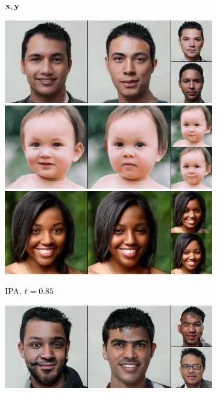 \begin{figure}[t]
\begin{subfigure}[t]{0.22\textwidth}
      \caption{${\mathbf{x}}, {\mathbf{y}}$}
    \end{subfigure}
    \begin{subfigure}[t]{0.25\textwidth}
      \centering
      \includegraphics[height=\ffhqimgheight]{figs/cigcvae/image-samples/ffhq256/freeform_aipo_0_t=0.85_samples.jpg}
      \includegraphics[height=\ffhqimgheight]{figs/cigcvae/image-samples/ffhq256/freeform_aipo_13_t=0.85_samples.jpg}
      \includegraphics[height=\ffhqimgheight]{figs/cigcvae/image-samples/ffhq256/freeform_aipo_32_t=0.85_samples.jpg}
      \caption{IPA, $t=0.85$}
    \end{subfigure}
    \begin{subfigure}[t]{0.25\textwidth}
      \centering
      \includegraphics[height=\ffhqimgheight]{figs/cigcvae/image-samples/ffhq256/freeform_aipo_0_samples.jpg}

\end{subfigure}
\end{figure}

